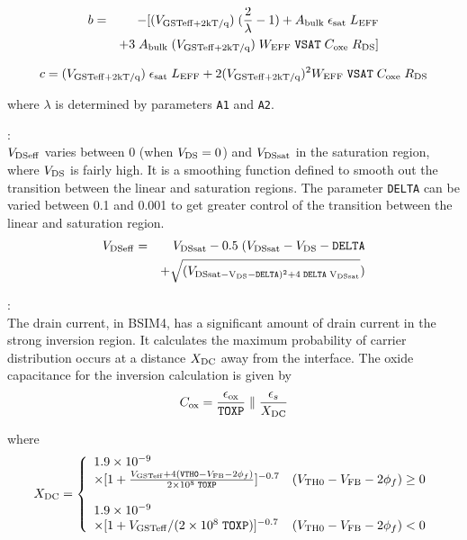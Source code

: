 \documentclass{article}
\begin{document}
\begin{eqnarray}
b & = & - [(V_{\rm{GSTeff} + {2 kT/q}})\;({2 \over \lambda} - 1) + A_{\rm{bulk}}\; \epsilon_{\rm{sat}}\;L_{\rm{EFF}} \nonumber \\
    & & + 3 \;A_{\rm{bulk}}\;(V_{\rm{GSTeff} + {2 kT/q}})\;W_{\rm{EFF}}\;\texttt{VSAT}\;C_{\rm{oxe}}\;R_{\rm{DS}}]
\end{eqnarray}

\begin{equation}
c = (V_{\rm{GSTeff} + {2 kT/q}})\; \epsilon_{\rm{sat}} \;
L_{\rm{EFF}} + 2(V_{\rm{GSTeff} + {2 kT/q}})^{2} W_{\rm{EFF}} \;
\texttt{VSAT}\;C_{\rm{oxe}}\;R_{\rm{DS}}
\end{equation}

\noindent where $\lambda$ is determined by parameters \texttt{A1}
and \texttt{A2}.

:\\
$V_{\rm{DSeff}}$ varies between 0 (when $V_{\rm{DS}} = 0$) and
$V_{\rm{DSsat}}$ in the saturation region, where $V_{\rm{DS}}$ is
fairly high. It is a smoothing function defined to smooth out the
transition between the linear and saturation regions. The
parameter \texttt{DELTA} can be varied between 0.1 and 0.001 to
get greater control of the transition between the linear and
saturation region.
\begin{eqnarray}
V_{\rm{DSeff}} & = & V_{\rm{DSsat}} - 0.5\;(V_{\rm{DSsat}} -
V_{\rm{DS}} - \texttt{DELTA}
\nonumber \\
            & & + \sqrt{(V_{\rm{DSsat} - V_{\rm{DS}} - \texttt{DELTA})^2 +
            4\;\texttt{DELTA}\;V_{\rm{DSsat}}}})
\end{eqnarray}

:\\
The drain current, in BSIM4, has a significant amount of drain
current in the strong inversion region. It calculates the maximum
probability of carrier distribution occurs at a distance
$X_{\rm{DC}}$ away from the interface. The oxide capacitance for
the inversion calculation is given by
\begin{equation}
C_{\rm{ox}} = {\epsilon_{\rm{ox}} \over \texttt{TOXP}} \; \| \;
{\epsilon_s \over X_{\rm{DC}}}
\end{equation}

where
\begin{equation}
X_{\rm{DC}} = \left\{\begin{array}{ll}
     1.9 \times 10^{-9} &  \nonumber\\
     \times [1 + {V_{\rm{GSTeff}} + 4(\texttt{VTH0} - V_{\rm{FB}} - 2\phi_f) \over 2 \times 10^8\;\texttt{TOXP}}]^{-0.7} & (V_{\rm{TH0}} - V_{\rm{FB}} - 2\phi_f) \geq 0 \nonumber \\
     & \\
     1.9 \times 10^{-9} & \nonumber \\
     \times [1 + V_{\rm{GSTeff}} / (2 \times 10^8\;\texttt{TOXP})]^{-0.7} & (V_{\rm{TH0}} - V_{\rm{FB}} - 2\phi_f) < 0
                            \end{array}
                    \right.
\end{equation}
\end{document}
